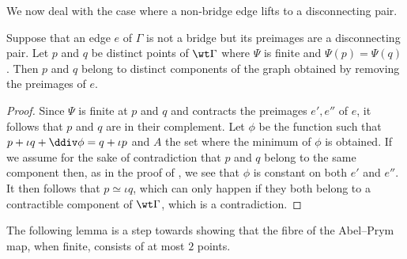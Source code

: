 \begin{exam}
\begin{figure}[ht]
\begin{subfigure}[t]{0.4\linewidth}
 \caption{}
\end{subfigure}
\hfill
 \caption[below]{ }
  \label{figpic9}
 \end{figure}
\end{exam}

We now deal with the case where a non-bridge edge lifts to a disconnecting pair.  

\begin{lemma}\label{lem:AbelPrymSeparatesTwoConnectedComponents2}
    Suppose that an edge $e$ of $\Gamma$ is not a bridge but its preimages are a disconnecting pair. Let $p$ and $q$ be distinct points of $\wt\Gamma$ where  $\Psi$ is finite and  $\Psi(p) = \Psi(q)$. Then $p$ and $q$ belong to distinct components of the graph obtained by removing the preimages of $e$. 
    \end{lemma}

\begin{proof}
Since $\Psi$ is finite at $p$ and $q$ and contracts the preimages $e',e''$ of $e$, it follows that $p$ and $q$ are in their complement. Let $\phi$ be the function such that $p + \iota q + \ddiv \phi = q + \iota p$ and $A$ the set where the minimum of $\phi$ is obtained.  If we assume for the sake of contradiction that $p$ and $q$ belong to the same  component then, as in the proof of , we see that $\phi$ is constant on both $e'$ and $e''$. It then follows that $p\simeq \iota q$, which can only happen if they both belong to a contractible component of $\wt\Gamma$, which is a contradiction. 
\end{proof}

The following lemma is a step towards showing that the fibre of the Abel--Prym map, when finite, consists of at most $2$ points. 

